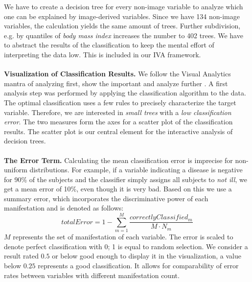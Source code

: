 \documentclass[a4paper,twoside]{style/article}
\begin{document}
We have to create a decision tree for every non-image variable to analyze which one can be explained by image-derived variables.
Since we have 134 non-image variables, the calculation yields the same amount of trees.
Further subdivision, e.g. by quantiles of \emph{body mass index} increases the number to 402 trees.
We have to abstract the results of the classification to keep the mental effort of interpreting the data low.
This is included in our IVA framework.
\\\\
\noindent \textbf{Visualization of Classification Results.}
We follow the Visual Analytics mantra of analyzing first, show the important and analyze further \cite{Keim}.
A first analysis step was performed by applying the classification algorithm to the data.
The optimal classification uses a few rules to precisely characterize the target variable.
Therefore, we are interested in \emph{small trees} with a \emph{low classification error}.
The two measures form the axes for a scatter plot of the classification results.
The scatter plot is our central element for the interactive analysis of decision trees.
\\\\
\noindent \textbf{The Error Term.}
Calculating the mean classification error is imprecise for non-uniform distributions.
For example, if a variable indicating a disease is negative for 90\% of the subjects and the classifier simply assigns all subjects to \emph{not ill}, we get a mean error of 10\%, even though it is very bad.
Based on this we use a summary error, which incorporates the discriminative power of each manifestation and is denoted as follows:
\begin{equation}
totalError = 1 - \sum_{m=1}^M \frac{correctlyClassified_{m}}{M\cdot N_m}
\end{equation}
$M$ represents the set of manifestation of each variable.
The error is scaled to denote perfect classification with 0; 1 is equal to random selection.
We consider a result rated $0.5$ or below good enough to display it in the visualization, a value below $0.25$ represents a good classification.
It allows for comparability of error rates between variables with different manifestation count.
\end{document}
